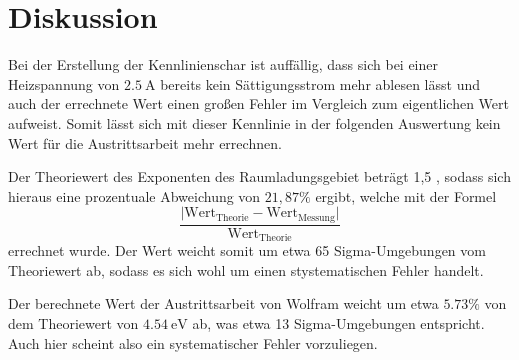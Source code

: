 \section{Diskussion}
\label{sec:Diskussion}
Bei der Erstellung der Kennlinienschar ist auffällig, dass sich bei einer
Heizspannung von $\SI{2.5}{\ampere}$ bereits kein Sättigungsstrom mehr ablesen lässt
und auch der errechnete Wert einen großen Fehler im Vergleich zum eigentlichen Wert
aufweist. Somit lässt sich mit dieser Kennlinie in der folgenden Auswertung kein Wert
für die Austrittsarbeit mehr errechnen.

\noindent Der Theoriewert des Exponenten des Raumladungsgebiet beträgt 1,5 \cite{skript},
sodass sich hieraus eine prozentuale Abweichung von $21,87 \% $ ergibt, welche mit der Formel
\begin{equation*}
  \frac{\lvert \text{Wert}_{\text{Theorie}}-\text{Wert}_{\text{Messung}}\rvert}{\text{Wert}_{\text{Theorie}}}
\end{equation*}
errechnet wurde.
Der Wert weicht somit um etwa 65 Sigma-Umgebungen vom Theoriewert ab, sodass es sich wohl um
einen stystematischen Fehler handelt.

\noindent Der berechnete Wert der Austrittsarbeit von Wolfram weicht um etwa
$5.73 \%$ von dem Theoriewert von $\SI{4.54}{\electronvolt}$ \cite{q5} ab, was etwa
13 Sigma-Umgebungen entspricht. Auch hier scheint also ein systematischer Fehler
vorzuliegen.
